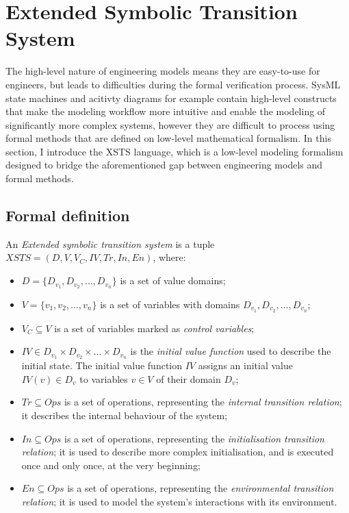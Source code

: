 \section{Extended Symbolic Transition System}\label{sec:xsts}

The high-level nature of engineering models means they are easy-to-use for engineers, but leads to difficulties during the formal verification process. SysML state machines and acitivty diagrams for example contain high-level  constructs that make the modeling workflow more intuitive and enable the modeling of significantly more complex systems, however they are difficult to process using formal methods that are defined on low-level mathematical formalism. In this section, I introduce the XSTS \cite{xsts} language, which is a low-level modeling formalism designed to bridge the aforementioned gap between engineering models and formal methods.

\subsection{Formal definition}

\begin{definition}
	
	An \emph{Extended symbolic transition system} is a tuple \( XSTS = (D, V, V_C, IV, Tr, In, En) \), where:
	
	\begin{itemize}
		\item \(D = \{ D_{v_1}, D_{v_2}, \dots, D_{v_n} \} \) is a set of value domains;
		\item \(V = \{ v_1, v_2, \dots, v_n \} \) is a set of variables with domains \(D_{v_1}, D_{v_2}, \dots, D_{v_n}\);
		\item \(V_C \subseteq V\) is a set of variables marked as \emph{control variables};
		\item \(IV \in D_{v_1} \times D_{v_2} \times \dots \times D_{v_n}\) is the \emph{initial value function} used to describe the initial state. The initial value function \(IV\) assigns an initial value \(IV(v) \in D_v\) to variables \(v \in V\) of their domain \(D_v\);
		\item \(Tr \subseteq Ops\) is a set of operations, representing the \emph{internal transition relation}; it describes the internal behaviour of the system;
		\item \(In \subseteq Ops\) is a set of operations, representing the \emph{initialisation transition relation}; it is used to describe more complex initialisation, and is executed once and only once, at the very beginning;
		\item \(En \subseteq Ops\) is a set of operations, representing the \emph{environmental transition relation}; it is used to model the system's interactions with its environment.
	\end{itemize}
\end{definition}\label{def:xsts}


